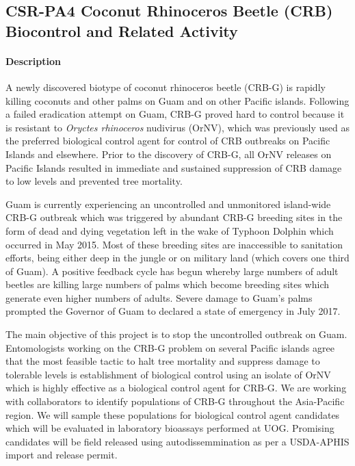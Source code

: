 \subsection{CSR-PA4 Coconut Rhinoceros Beetle (CRB) Biocontrol and Related Activity}\label{sec:coconut-rhinoceros-beetle-(crb)-biocontrol}
\begin{refsection}
	
\paragraph{Description}

A newly discovered biotype of coconut rhinoceros beetle (CRB-G) is
rapidly killing coconuts and other palms on Guam and on other Pacific
islands. Following a failed eradication attempt on Guam, CRB-G proved
hard to control because it is resistant to \emph{Oryctes rhinoceros}
nudivirus (OrNV), which was previously used as the preferred biological
control agent for control of CRB outbreaks on Pacific Islands and
elsewhere. Prior to the discovery of CRB-G, all OrNV releases on
Pacific Islands resulted in immediate and sustained suppression of
CRB damage to low levels and prevented tree mortality.

Guam is currently experiencing an uncontrolled and unmonitored island-wide
CRB-G outbreak which was triggered by abundant CRB-G breeding sites
in the form of dead and dying vegetation left in the wake of Typhoon
Dolphin which occurred in May 2015. Most of these
breeding sites are inaccessible to sanitation efforts, being either deep
in the jungle or on military land (which covers one third of Guam).
A positive feedback cycle has begun whereby large numbers of adult
beetles are killing large numbers of palms which become breeding sites
which generate even higher numbers of adults. Severe damage to Guam's
palms prompted the Governor of Guam to declared a state of emergency
in July 2017.

The main objective of this project is to stop the uncontrolled outbreak
on Guam. Entomologists working on the CRB-G problem on several Pacific
islands agree that the most feasible tactic to halt tree mortality
and suppress damage to tolerable levels is establishment of biological
control using an isolate of OrNV which is highly effective as a biological
control agent for CRB-G. We are working with collaborators to identify
populations of CRB-G throughout the Asia-Pacific region. We will sample
these populations for biological control agent candidates which will
be evaluated in laboratory bioassays performed at UOG. Promising candidates
will be field released using autodissemmination as per a USDA-APHIS
import and release permit.


\end{refsection}
